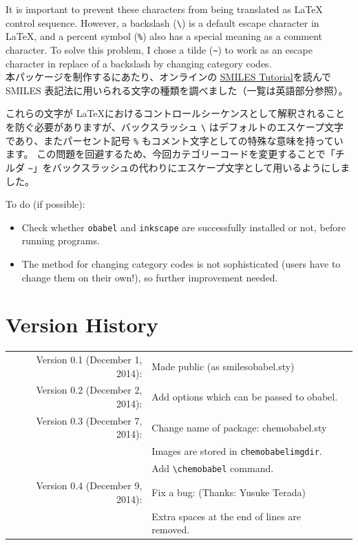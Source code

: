 \documentclass[12pt]{jsarticle}
\begin{document}
It is important to prevent these characters from being translated as {\LaTeX} control sequence.
However, a backslash (\verb|\|) is a default escape character in {\LaTeX}, and a percent symbol (\verb|%|) also has a special meaning as a comment character.
To solve this problem, I chose a tilde (\verb|~|) to work as an escape character in replace of a backslash by changing category codes. \\

本パッケージを制作するにあたり、オンラインの \href{http://www.daylight.com/meetings/summerschool98/course/dave/smiles-intro.html}{SMILES Tutorial}を読んで SMILES 表記法に用いられる文字の種類を調べました（一覧は英語部分参照）。

これらの文字が \LaTeX におけるコントロールシーケンスとして解釈されることを防ぐ必要がありますが、バックスラッシュ \verb|\| はデフォルトのエスケープ文字であり、またパーセント記号 \verb|%| もコメント文字としての特殊な意味を持っています。
この問題を回避するため、今回カテゴリーコードを変更することで「チルダ \verb|~|」をバックスラッシュの代わりにエスケープ文字として用いるようにしました。

\clearpage

To do (if possible):
\begin{itemize}
\item Check whether \texttt{obabel} and \texttt{inkscape} are successfully installed or not, before running programs.
\item The method for changing category codes is not sophisticated (users have to change them on their own!), so further improvement needed.
\end{itemize}

\section{Version History}

\begin{table}[h]
\centering
\begin{tabular}{rll}
Version 0.1 (December 1, 2014): & Made public (as \textsf{smilesobabel.sty}) \\
Version 0.2 (December 2, 2014): & Add options which can be passed to obabel. \\
Version 0.3 (December 7, 2014): & Change name of package: \textsf{chemobabel.sty} \\
 & Images are stored in \texttt{chemobabelimgdir}. \\
 & Add \verb|\chemobabel| command. \\
Version 0.4 (December 9, 2014): & Fix a bug: (Thanks: Yusuke Terada) \\
 & Extra spaces at the end of lines are removed.
\end{tabular}
\end{table}
\end{document}
